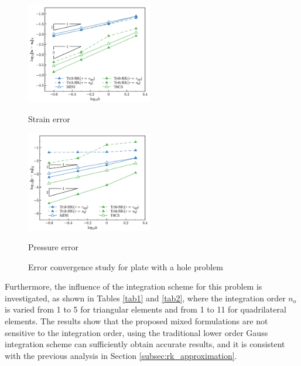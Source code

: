 \begin{figure}[H]
\centering
\begin{subcaptiongroup}
\centering
\parbox[b]{0.49\textwidth}{
    \includegraphics[width=0.49\textwidth]{png/plate_with_hole_Hdev_r1.png}
    \caption{Strain error}\label{fg:plate_with_hole_convergence_strain}
}
\parbox[b]{0.49\textwidth}{
    \includegraphics[width=0.49\textwidth]{png/plate_with_hole_L2_p_r1.png}
    \caption{Pressure error}\label{fg:plate_with_hole_convergence_pressure}
}
\end{subcaptiongroup}
\caption{Error convergence study for plate with a hole problem}\label{fg:plate_with_hole_convergence}
\end{figure}

Furthermore, the influence of the integration scheme for this problem is investigated,
as shown in Tables \ref{tab1} and \ref{tab2},
where the integration order $n_o$ is varied from 1 to 5 for triangular elements and from 1 to 11 for quadrilateral elements. 
The results show that the proposed mixed formulations are not sensitive to the integration order,
using the traditional lower order Gauss integration scheme can sufficiently obtain accurate results,
and it is consistent with the previous analysis in Section \ref{subsec:rk_approximation}.

